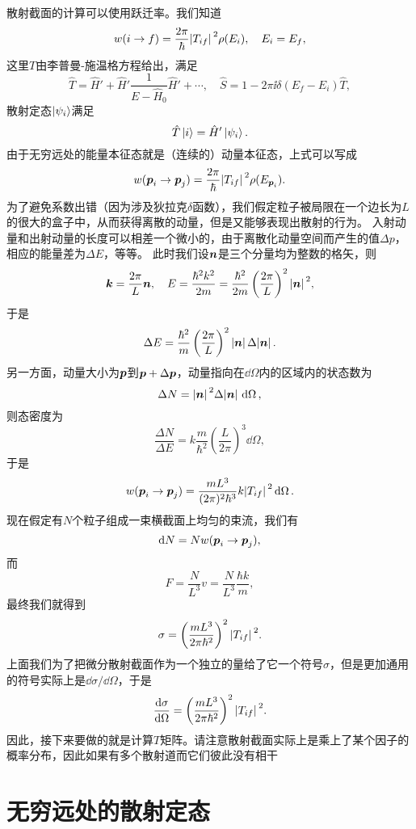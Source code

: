 散射截面的计算可以使用跃迁率。我们知道
\[
    w(i \to f) = \frac{2\pi}{\hbar} \abs*{T_{if}}^2 \rho(E_i), \quad E_i = E_f,
\]
这里$T$由李普曼-施温格方程给出，满足
\[
    \hat{T} = \hat{H}' + \hat{H}' \frac{1}{E - \hat{H}_0} \hat{H}' + \cdots, \quad \hat{S} = 1 - 2 \pi \ii \delta(E_f - E_i) \hat{T},
\]
散射定态$\ket{\psi_i}$满足
\[
    \hat{T} \ket{i} = \hat{H}' \ket{\psi_i}.
\]
由于无穷远处的能量本征态就是（连续的）动量本征态，上式可以写成
\[
    w(\vb*{p}_i \to \vb*{p}_j) = \frac{2\pi}{\hbar} \abs*{T_{if}}^2 \rho(E_{\vb*{p}_i}).
\]
为了避免系数出错（因为涉及狄拉克$\delta$函数），我们假定粒子被局限在一个边长为$L$的很大的盒子中，从而获得离散的动量，但是又能够表现出散射的行为。
入射动量和出射动量的长度可以相差一个微小的，由于离散化动量空间而产生的值$\Delta p$，相应的能量差为$\Delta E$，等等。
此时我们设$\vb*{n}$是三个分量均为整数的格矢，则
\[
    \vb*{k} = \frac{2\pi}{L} \vb*{n}, \quad E = \frac{\hbar^2 k^2}{2m} = \frac{\hbar^2}{2m} \left( \frac{2\pi}{L} \right)^2 \abs*{\vb*{n}}^2,
\]
于是
\[
    \Delta E = \frac{\hbar^2}{m} \left( \frac{2\pi}{L} \right)^2 \abs*{\vb*{n}} \Delta \abs*{\vb*{n}}.
\]
另一方面，动量大小为$\vb*{p}$到$\vb*{p}+\Delta \vb*{p}$，动量指向在$\dd{\Omega}$内的区域内的状态数为
\[
    \Delta N = \abs*{\vb*{n}}^2 \Delta \abs*{\vb*{n}} \dd{\Omega},
\]
则态密度为
\[
    \frac{\Delta N}{\Delta E} = k \frac{m}{\hbar^2} \left( \frac{L}{2\pi} \right)^3 \dd{\Omega},
\]
于是
\begin{equation}
    w(\vb*{p}_i \to \vb*{p}_j) = \frac{mL^3}{(2\pi)^2 \hbar^3} k \abs*{T_{if}}^2 \dd{\Omega}.
\end{equation}
现在假定有$N$个粒子组成一束横截面上均匀的束流，我们有
\[
    \dd{N} = N w(\vb*{p}_i \to \vb*{p}_j),
\]
而
\[
    F = \frac{N}{L^3} v = \frac{N}{L^3} \frac{\hbar k}{m},
\]
最终我们就得到
\[
    \sigma = \left( \frac{m L^3}{2\pi \hbar^2} \right)^2 \abs*{T_{if}}^2.
\]
上面我们为了把微分散射截面作为一个独立的量给了它一个符号$\sigma$，但是更加通用的符号实际上是$\dd{\sigma}/\dd{\Omega}$，于是
\begin{equation}
    \dv{\sigma}{\Omega} = \left( \frac{m L^3}{2\pi \hbar^2} \right)^2 \abs*{T_{if}}^2.
    \label{eq:quantum-cross-section-and-t}
\end{equation}
因此，接下来要做的就是计算$T$矩阵。请注意散射截面实际上是乘上了某个因子的概率分布，因此如果有多个散射道而它们彼此没有相干

\section{无穷远处的散射定态}

